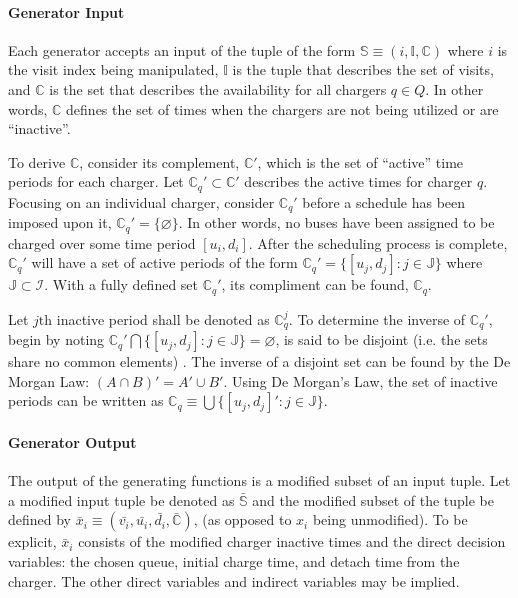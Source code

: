 \documentclass[11pt,a4paper,final]{article}
\newcommand{\I}{\mathbb{I}}                 %
\newcommand{\C}{\mathbb{C}}                 %
\newcommand{\Sol}{\mathbb{S}}               %
\newcommand{\Qset}{Q}                       %
\newcommand{\Jsetq}{\mathbb{J}}             %
\begin{document}
\paragraph{Generator Input}
\label{sec:org5a2a6c0}
Each generator accepts an input of the tuple of the form \(\Sol \equiv (i, \I, \C)\) where \(i\) is the visit index being
manipulated, \(\I\) is the tuple that describes the set of visits, and \(\C\) is the set that describes the availability for
all chargers \(q \in \Qset\). In other words, \(\C\) defines the set of times when the chargers are not being utilized or are
``inactive''.

To derive \(\C\), consider its complement, \(\C'\), which is the set of ``active'' time periods for each charger. Let \(\C_q' \subset
\C'\) describes the active times for charger \(q\). Focusing on an individual charger, consider \(\C_q'\) before a schedule
has been imposed upon it, \(\C_q' = \{ \varnothing \}\). In other words, no buses have been assigned to be charged over
some time period \([u_i, d_i]\). After the scheduling process is complete, \(\C_q'\) will have a set of active periods of
the form \(\C_q' = \{[u_j, d_j]: j \in \Jsetq \}\) where \(\Jsetq \subset \mathcal{I}\). With a fully defined set \(\C_q'\), its compliment can
be found, \(\C_q\).

Let \(j\text{th}\) inactive period shall be denoted as \(\C^j_q\). To determine the inverse of \(\C_q'\), begin by noting
\(\C_q' \bigcap \{[u_j, d_j] : j \in \Jsetq\} = \varnothing\), is said to be disjoint (i.e. the sets share no common elements)
\cite{halmos-1974-naive-set-theor}. The inverse of a disjoint set can be found by the De Morgan Law: \((A \cap B)' = A' \cup
B'\). Using De Morgan's Law, the set of inactive periods can be written as \(\C_q \equiv \bigcup \{[u_j, d_j]': j \in \Jsetq\}\).

\paragraph{Generator Output}
\label{sec:org9255e41}
The output of the generating functions is a modified subset of an input tuple. Let a modified input tuple be denoted as
\(\bar{\Sol}\) and the modified subset of the tuple be defined by \(\bar{x}_i \equiv (\bar{v_i}, \bar{u_i}, \bar{d_i},
\bar{\C})\), (as opposed to \(x_i\) being unmodified). To be explicit, \(\bar{x}_i\) consists of the modified charger
inactive times and the direct decision variables: the chosen queue, initial charge time, and detach time from the
charger. The other direct variables and indirect variables may be implied.
\end{document}
